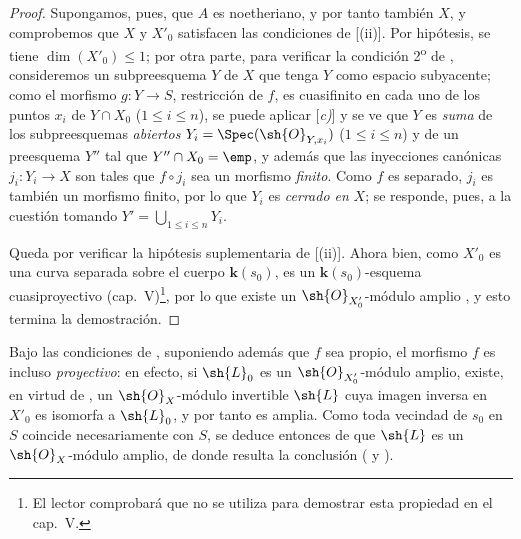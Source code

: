 \begin{proof}
Supongamos, pues, que $A$ es noetheriano, y por tanto también $X$, y comprobemos que $X$ y $X'_0$ satisfacen las condiciones de [(ii)].
Por hipótesis, se tiene $\dim(X'_0)\leq1$;
por otra parte, para verificar la condición 2\textsuperscript{o} de , consideremos un subpreesquema $Y$ de $X$ que tenga $Y$ como espacio subyacente;
como el morfismo $g:Y\to S$, restricción de $f$, es cuasifinito en cada uno de los puntos $x_i$ de $Y\cap X_0$ ($1\leq i\leq n$), se puede aplicar [\emph{c)}] y se ve que $Y$ es \emph{suma} de los subpreesquemas \emph{abiertos} $Y_i=\Spec(\sh{O}_{Y,x_i})$ ($1\leq i\leq n$) y de un preesquema $Y''$ tal que $Y''\cap X_0=\emp$, y además que las inyecciones canónicas $j_i:Y_i\to X$ son tales que $f\circ j_i$ sea un morfismo \emph{finito}.
Como $f$ es separado, $j_i$ es también un morfismo finito, por lo que $Y_i$ es \emph{cerrado en} $X$;
se responde, pues, a la cuestión tomando $Y'=\bigcup_{1\leq i\leq n}Y_i$.

Queda por verificar la hipótesis suplementaria de [(ii)].
Ahora bien, como $X'_0$ es una curva separada sobre el cuerpo $\boldsymbol{k}(s_0)$, es un $\boldsymbol{k}(s_0)$-esquema cuasiproyectivo (cap.~V)\footnote{El lector comprobará que  no se utiliza para demostrar esta propiedad en el cap.~V.}, por lo que existe un $\sh{O}_{X'_0}$-módulo amplio , y esto termina la demostración.
\end{proof}

\begin{remark}[21.9.13]
\label{IV.21.9.13}
Bajo las condiciones de , suponiendo además que $f$ sea propio, el morfismo $f$ es incluso \emph{proyectivo}:
en efecto, si $\sh{L}_0$ es un $\sh{O}_{X'_0}$-módulo amplio, existe, en virtud de , un $\sh{O}_X$-módulo invertible $\sh{L}$ cuya imagen inversa en $X'_0$ es isomorfa a $\sh{L}_0$, y por tanto es amplia.
Como toda vecindad de $s_0$ en $S$ coincide necesariamente con $S$, se deduce entonces de  que $\sh{L}$ es un $\sh{O}_X$-módulo amplio, de donde resulta la conclusión ( y ).
\end{remark}

